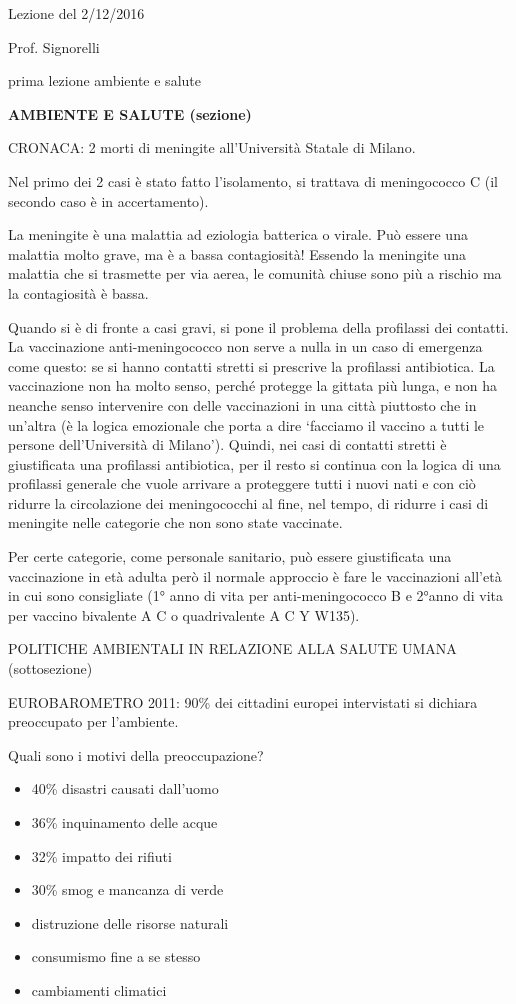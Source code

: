 \documentclass[]{article}
\date{}
\begin{document}
Lezione del 2/12/2016

Prof. Signorelli

prima lezione ambiente e salute

\textbf{AMBIENTE E SALUTE (sezione)}

CRONACA: 2 morti di meningite all'Università Statale di Milano.

Nel primo dei 2 casi è stato fatto l'isolamento, si trattava di
meningococco C (il secondo caso è in accertamento).

La meningite è una malattia ad eziologia batterica o virale. Può essere
una malattia molto grave, ma è a bassa contagiosità! Essendo la
meningite una malattia che si trasmette per via aerea, le comunità
chiuse sono più a rischio ma la contagiosità è bassa.

Quando si è di fronte a casi gravi, si pone il problema della profilassi
dei contatti. La vaccinazione anti-meningococco non serve a nulla in un
caso di emergenza come questo: se si hanno contatti stretti si prescrive
la profilassi antibiotica. La vaccinazione non ha molto senso, perché
protegge la gittata più lunga, e non ha neanche senso intervenire con
delle vaccinazioni in una città piuttosto che in un'altra (è la logica
emozionale che porta a dire `facciamo il vaccino a tutti le persone
dell'Università di Milano'). Quindi, nei casi di contatti stretti è
giustificata una profilassi antibiotica, per il resto si continua con la
logica di una profilassi generale che vuole arrivare a proteggere tutti
i nuovi nati e con ciò ridurre la circolazione dei meningococchi al
fine, nel tempo, di ridurre i casi di meningite nelle categorie che non
sono state vaccinate.

Per certe categorie, come personale sanitario, può essere giustificata
una vaccinazione in età adulta però il normale approccio è fare le
vaccinazioni all'età in cui sono consigliate (1° anno di vita per
anti-meningococco B e 2°anno di vita per vaccino bivalente A C o
quadrivalente A C Y W135).

POLITICHE AMBIENTALI IN RELAZIONE ALLA SALUTE UMANA (sottosezione)

EUROBAROMETRO 2011: 90\% dei cittadini europei intervistati si dichiara
preoccupato per l'ambiente.

Quali sono i motivi della preoccupazione?

\begin{itemize}
\item
  40\% disastri causati dall'uomo
\item
  36\% inquinamento delle acque
\item
  32\% impatto dei rifiuti
\item
  30\% smog e mancanza di verde
\item
  distruzione delle risorse naturali
\item
  consumismo fine a se stesso
\item
  cambiamenti climatici
\end{itemize}
\end{document}
